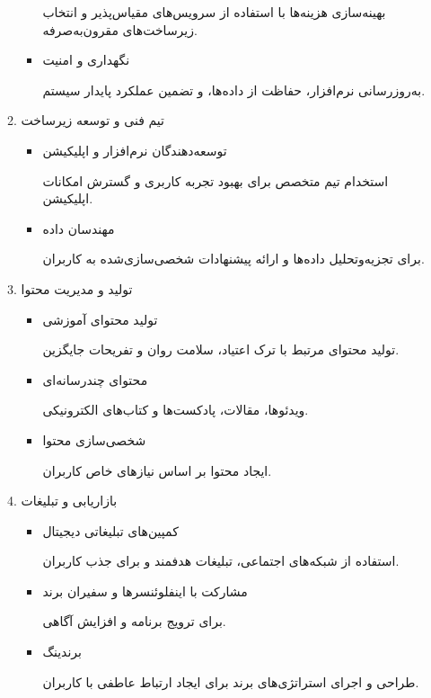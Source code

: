 \documentclass[dvipsnames, svgnames, x11names, 11pt]{article}
\begin{document}
\begin{itemize}
\begin{enumerate}
\begin{itemize}
بهینه‌سازی هزینه‌ها با استفاده از سرویس‌های مقیاس‌پذیر و انتخاب زیرساخت‌های مقرون‌به‌صرفه.  

\item 
نگهداری و امنیت

به‌روزرسانی نرم‌افزار، حفاظت از داده‌ها، و تضمین عملکرد پایدار سیستم.  
\end{itemize}

\item 
تیم فنی و توسعه زیرساخت  
\begin{itemize}
\item 
توسعه‌دهندگان نرم‌افزار و اپلیکیشن

استخدام تیم متخصص برای بهبود تجربه کاربری و گسترش امکانات اپلیکیشن.  

\item 
مهندسان داده

برای تجزیه‌وتحلیل داده‌ها و ارائه پیشنهادات شخصی‌سازی‌شده به کاربران.  
\end{itemize}

\item 
تولید و مدیریت محتوا  
\begin{itemize}
\item 
تولید محتوای آموزشی

تولید محتوای مرتبط با ترک اعتیاد، سلامت روان و تفریحات جایگزین.  

\item 
محتوای چندرسانه‌ای

ویدئوها، مقالات، پادکست‌ها و کتاب‌های الکترونیکی.  

\item 
شخصی‌سازی محتوا

ایجاد محتوا بر اساس نیازهای خاص کاربران.  
\end{itemize}

\item 
بازاریابی و تبلیغات   
\begin{itemize}
\item 
کمپین‌های تبلیغاتی دیجیتال

استفاده از شبکه‌های اجتماعی، تبلیغات هدفمند و  برای جذب کاربران.  

\item 
مشارکت با اینفلوئنسرها و سفیران برند

برای ترویج برنامه و افزایش آگاهی.  

\item 
برندینگ

طراحی و اجرای استراتژی‌های برند برای ایجاد ارتباط عاطفی با کاربران.  
\end{itemize}


\end{enumerate}
\end{itemize}
\end{document}
